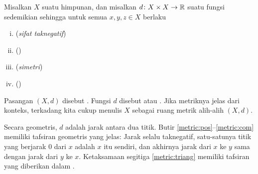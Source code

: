 \begin{defn}
Misalkan $X$ suatu himpunan, dan misalkan
$d \colon X \times X \to {\mathbb{R}}$
suatu fungsi sedemikian sehingga untuk semua $x,y,z \in X$ berlaku
\begin{enumerate}[(i)]
%
\item \label{metric:pos}
(\emph{sifat taknegatif})
%
\item \label{metric:zero}
(\emph{})
%
\item \label{metric:com}
(\emph{simetri})
%
\item \label{metric:triang}
(\emph{})
\end{enumerate}
Pasangan $(X,d)$ disebut \emph{}.  Fungsi $d$
disebut \emph{} atau \emph{}.
Jika metriknya jelas dari konteks, terkadang kita cukup menulis $X$
sebagai ruang metrik alih-alih $(X,d)$.
\end{defn}

Secara geometris, $d$ adalah jarak antara dua titik.
Butir \ref{metric:pos}--\ref{metric:com} memiliki tafsiran geometris yang
jelas: Jarak selalu taknegatif, satu-satunya titik yang berjarak 0 dari
$x$ adalah $x$ itu sendiri, dan akhirnya jarak dari $x$ ke $y$ sama dengan
jarak dari $y$ ke $x$.  Ketaksamaan segitiga \ref{metric:triang}
memiliki tafsiran yang diberikan dalam
.
\begin{myfigureht}
\caption{Diagram ketaksamaan segitiga dalam ruang metrik.\label{fig:mstriang}}
\end{myfigureht}


